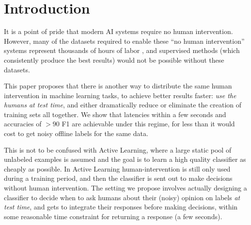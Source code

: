 
\section{Introduction}



It is a point of pride that modern AI systems require no human intervention.
However, many of the datasets required to enable these ``no human intervention'' systems represent thousands of hours of labor \cite{AMR}\cite{ImageNET}, and supervised methods (which consistently produce the best results) would not be possible without these datasets.

This paper proposes that there is another way to distribute the same human intervention in machine learning tasks, to achieve better results faster: {\em use the humans at test time}, and either dramatically reduce or eliminate the creation of training sets all together. We show that latencies within a few seconds and accuracies of $> 90$ F1 are achievable under this regime, for less than it would cost to get noisy offline labels for the same data.

This is not to be confused with Active Learning, where a large static pool of unlabeled examples is assumed and the goal is to learn a high quality classifier as cheaply as possible. In Active Learning human-intervention is still only used during a training period, and then the classifier is sent out to make decisions without human intervention. The setting we propose involves actually designing a classifier to decide when to ask humans about their (noisy) opinion on labels {\em at test time}, and gets to integrate their responses before making decisions, within some reasonable time constraint for returning a response (a few seconds).

